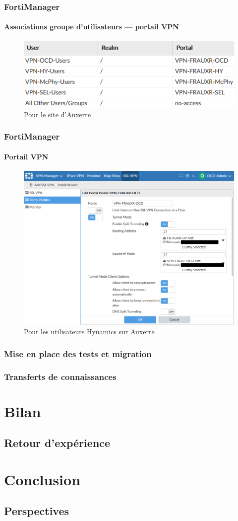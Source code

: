 \documentclass[french, a4paper]{beamer}
\begin{document}
\begin{frame}
    \frametitle{FortiManager}
    \framesubtitle{Associations groupe d'utilisateurs --- portail VPN}
    \begin{figure}[h!]
        \centering
        \includegraphics[width = \linewidth]{img/fmg/ssl-mappings.png}
        \caption{Pour le site d'Auxerre}%
        \label{fig:fmg/ssl-mappings}
    \end{figure}
\end{frame}

\begin{frame}
    \frametitle{FortiManager}
    \framesubtitle{Portail VPN}
    \begin{figure}[h!]
        \centering
        \includegraphics[width = 0.8\linewidth]{img/fmg/ssl-portal.png}
        \caption{Pour les utilisateurs Hynamics sur Auxerre}%
        \label{fig:fmg/ssl-portal}
    \end{figure}
\end{frame}

\subsubsection{Mise en place des tests et migration}
\subsubsection{Transferts de connaissances}


\section{Bilan}
\subsection{Retour d'expérience}


\section{Conclusion}
\subsection{Perspectives}
\end{document}
